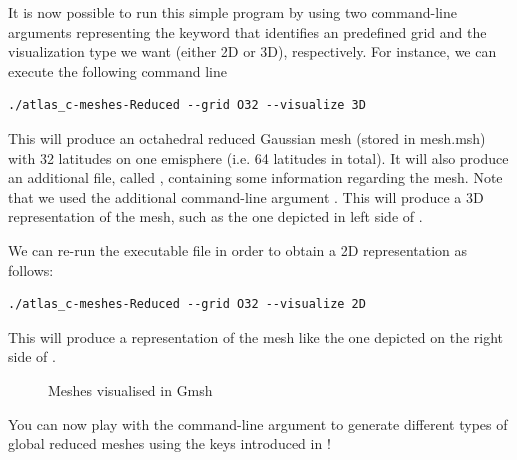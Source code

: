 It is now possible to run this simple program by using 
two command-line arguments representing the keyword that 
identifies an \Atlas predefined grid and the visualization 
type we want (either 2D or 3D), respectively. For instance, 
we can execute the following command line
%
\begin{lstlisting}[style=BashStyle]
./atlas_c-meshes-Reduced --grid O32 --visualize 3D
\end{lstlisting}
% 
This will produce an octahedral reduced Gaussian mesh 
(stored in mesh.msh) with 32 latitudes on one emisphere 
(i.e. 64 latitudes in total). It will also produce an 
additional file, called , containing
some information regarding the mesh.
Note that we used the additional command-line argument 
. This will produce a 3D representation 
of the mesh, such as the one depicted in left side of 
.

We can re-run the executable file in order to obtain 
a 2D representation as follows:
%
\begin{lstlisting}[style=BashStyle]
./atlas_c-meshes-Reduced --grid O32 --visualize 2D
\end{lstlisting}
% 
This will produce a representation of the mesh like 
the one depicted on the right side of .
%
\begin{figure}%
\centering
{}\qquad\qquad\qquad
{}
\caption{Meshes visualised in Gmsh}%
\label{fig:meshes}%
\end{figure}
%
You can now play with the command-line argument to generate 
different types of global reduced meshes using the keys 
introduced in !




